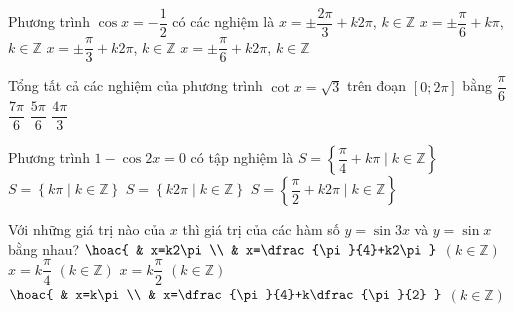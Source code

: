 \begin{ex}%
	Phương trình $\cos x=-\dfrac{1}{2}$ có các nghiệm là 
	 \choice
		{\True $x= \pm \dfrac{2\pi}{3}+k 2 \pi$, $k  \in \mathbb{Z}$}
		{$x= \pm \dfrac{\pi}{6}+k \pi$, $k \in \mathbb{Z}$} 
		{$x= \pm \dfrac{\pi}{3}+k  2 \pi$, $k \in \mathbb{Z}$}
		{$x= \pm \dfrac{\pi}{6}+k  2 \pi$, $k \in \mathbb{Z}$}
\end{ex}

\begin{ex}%
	Tổng tất cả các nghiệm của phương trình $\cot x=\sqrt{3}$ trên đoạn  $\left[0; 2\pi \right]$ bằng
	\choice 
		{$\dfrac{\pi}{6}$} 
		{$\dfrac{7\pi}{6}$} 
		{$\dfrac{5\pi}{6}$} 
		{\True $\dfrac{4\pi}{3}$} 
\end{ex}

\begin{ex}%
	Phương trình $1-\cos  2x=0$ có tập nghiệm là
	\choice 
		{$S=\left\lbrace\dfrac{\pi}{4}+k\pi\mid k\in\mathbb{Z}\right\rbrace$} 
		 {\True $S=\left\lbrace k\pi\mid k\in\mathbb{Z}\right\rbrace$}
		{$S=\left\lbrace  k2\pi\mid k\in\mathbb{Z}\right\rbrace$}
		{$S=\left\lbrace \dfrac{\pi}{2}+k2\pi\mid  k\in\mathbb{Z}\right\rbrace$}
\end{ex}

\begin{ex}%
	Với những giá trị nào của $x$ thì giá trị của các hàm số  $y=\sin 3x$ và $y=\sin x$ bằng nhau?
	 \choice
		{$\hoac{ 
		&  x=k2\pi\\
		 & x=\dfrac{\pi}{4}+k2\pi
		}$ $(k\in\mathbb{Z})$} 
		{$x=k\dfrac{\pi}{4}$ $(k\in\mathbb{Z})$} 
		{$x=k\dfrac{\pi}{2}$ $(k\in\mathbb{Z})$} 
		{\True $\hoac{ 
		& x=k\pi\\ 
		 & x=\dfrac{\pi}{4}+k\dfrac{\pi}{2}
		 }$ $(k\in\mathbb{Z})$}
\end{ex}


